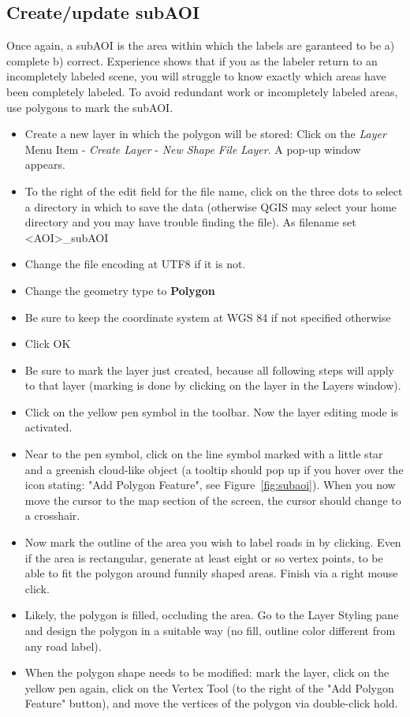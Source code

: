 \documentclass[12pt,a4paper]{scrartcl}
\begin{document}
\subsection{Create/update subAOI}
Once again, a subAOI is the area within which the labels are garanteed to be a) complete b) correct. Experience shows that if you as the labeler return to an incompletely labeled scene, you will struggle to know exactly which areas have been completely labeled. To avoid redundant work or incompletely labeled areas, use polygons to mark the subAOI.

\begin{itemize}
	\item Create a new layer in which the polygon will be stored: Click on the \textit{Layer} Menu Item - \textit{Create Layer} - \textit{New Shape File Layer}. A pop-up window appears.
	\item To the right of the edit field for the file name, click on the three dots to select a directory in which to save the data (otherwise QGIS may select your home directory and you may have trouble finding the file). As filename set <AOI>\_subAOI
	\item Change the file encoding at UTF8 if it is not.
	\item Change the geometry type to \textbf{Polygon}
	\item Be sure to keep the coordinate system at WGS 84 if not specified otherwise
	\item Click OK
	\item Be sure to mark the layer just created, because all following steps will apply to that layer (marking is done by clicking on the layer in the Layers window). 
	\item Click on the yellow pen symbol in the toolbar. Now the layer editing mode is activated.
	\item Near to the pen symbol, click on the line symbol marked with a little star and a greenish cloud-like object (a tooltip should pop up if you hover over the icon stating: "Add Polygon Feature", see Figure~\ref{fig:subaoi}). When you now move the cursor to the map section of the screen, the cursor should change to a crosshair.
	\item Now mark the outline of the area you wish to label roads in by clicking. Even if the area is rectangular, generate at least eight or so vertex points, to be able to fit the polygon around funnily shaped areas. Finish via a right mouse click.
	\item Likely, the polygon is filled, occluding the area. Go to the Layer Styling pane and design the polygon in a suitable way (no fill, outline color different from any road label).
	\item When the polygon shape needs to be modified: mark the layer, click on the yellow pen again, click on the Vertex Tool (to the right of the "Add Polygon Feature" button), and move the vertices of the polygon via double-click hold.
\end{itemize}
\end{document}

